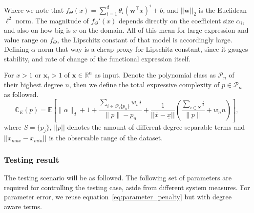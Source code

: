 \documentclass[10pt]{article} %
\begin{document}
Where we note that $f_{\Theta}(x)=\sum_{i=1}^{d} \theta_i \left( \mathbf{w}^\top x \right)^i + b$, and $||\mathbf{w}||_{2}$ is the Euclidean $\ell^{2}$ norm. The magnitude of $f_{\Theta}'(x)$ depends directly on the coefficient size $\alpha_{i}$, and also on how big is $x$ on the domain. All of this mean for large expression and value range on $f_{\Theta}$, the Lipschitz constant of that model is accordingly large. Defining $\alpha$-norm that way is a cheap proxy for Lipschitz constant, since it gauges stability, and rate of change of the functional expression itself. 

\begin{definition}\label{def:pec}
    For $x>1$ or $\mathbf{x}_{i}>1$ of $\mathbf{x}\in\mathbb{R}^{n}$ as input. Denote the polynomial class as $\mathcal{P}_{n}$ of their highest degree $n$, then we define the total expressive complexity of $p\in \mathcal{P}_{n}$ as followed.
    \begin{equation}
\mathbb{C}_{E}(p)
= \mathbb{E}\!\left[
\|\alpha\|_{d} + 1
+ \frac{\sum_{i\in S\setminus\{p_{n}\}} w_i\,i}{\|p\|-p_{n}}
+ \frac{1}{||\overline{x}-\underline{x}||}\!\left(
\frac{\sum_{i\in S} i}{\|p\|} + w_{n}n
\right)
\right],
\end{equation}
    where $S=\{p_{j}\}$, $||p||$ denotes the amount of different degree separable terms and $||x_{max}-x_{min}||$ is the observable range of the dataset. 
\end{definition}
\subsubsection{Testing result}
The testing scenario will be as followed. The following set of parameters are required for controlling the testing case, aside from different system measures. For parameter error, we reuse equation~\ref{eq:parameter_penalty} but with degree aware terms. 
\end{document}
